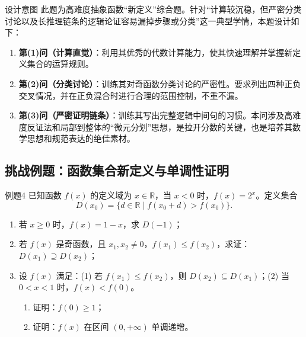 \documentclass[11pt,a4paper]{ctexart}
\begin{document}
\begin{teachbox}{设计意图}
此题为高难度抽象函数“新定义”综合题。针对“计算较沉稳，但严密分类讨论以及长推理链条的逻辑论证容易漏掉步骤或分类”这一典型学情，本题设计如下：
\begin{enumerate}
  \item \textbf{第(1)问（计算直觉）}：利用其优秀的代数计算能力，使其快速理解并掌握新定义集合的运算规则。
  \item \textbf{第(2)问（分类讨论）}：训练其对奇函数分类讨论的严密性。要求列出四种正负交叉情况，并在正负混合时进行合理的范围控制，不重不漏。
  \item \textbf{第(3)问（严密证明链条）}：训练其写出完整逻辑中间句的习惯。本问涉及高难度反证法和局部到整体的“微元分划”思想，是拉开分数的关键，也是培养其数学思想和规范表达的绝佳素材。
\end{enumerate}
\end{teachbox}

\subsection{挑战例题：函数集合新定义与单调性证明}

\begin{exbox}{例题4}
已知函数 $f(x)$ 的定义域为 $x \in \mathbb{R}$，当 $x < 0$ 时，$f(x) = 2^x$。定义集合
\[
D(x_0) = \{d \in \mathbb{R} \mid f(x_0 + d) > f(x_0)\}.
\]
\begin{enumerate}[label=(\arabic*)]
  \item 若 $x \ge 0$ 时，$f(x) = 1 - x$，求 $D(-1)$；
  \item 若 $f(x)$ 是奇函数，且 $x_1, x_2 \neq 0$，$f(x_1) \le f(x_2)$，求证：$D(x_1) \supseteq D(x_2)$；
  \item 设 $f(x)$ 满足：(1) 若 $f(x_1) \le f(x_2)$，则 $D(x_2) \subseteq D(x_1)$；(2) 当 $0 < x < 1$ 时，$f(x) < f(0)$。
  \begin{enumerate}[label=(\roman*)]
    \item 证明：$f(0) \ge 1$；
    \item 证明：$f(x)$ 在区间 $(0, +\infty)$ 单调递增。
  \end{enumerate}
\end{enumerate}
\end{exbox}
\end{document}

